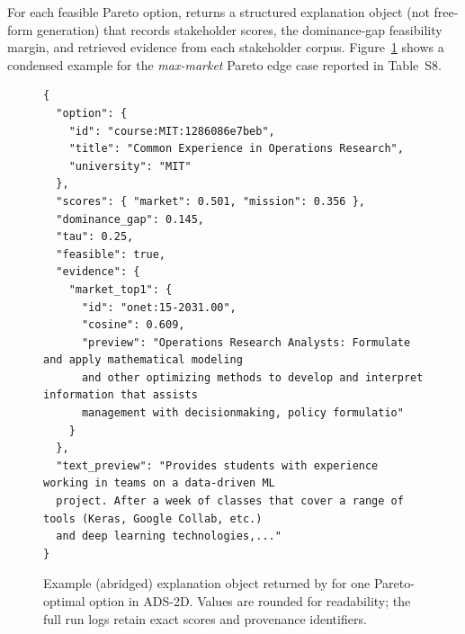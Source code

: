 





For each feasible Pareto option, \MAPE returns a structured explanation object (not free-form generation) that records stakeholder scores, the dominance-gap feasibility margin, and retrieved evidence from each stakeholder corpus. Figure~\ref{fig:supp-explobj} shows a condensed example for the \textit{max-market} Pareto edge case reported in Table~S8.

\begin{figure}[h]
  \centering
  \small
  \begin{minipage}{0.96\linewidth}
\begin{verbatim}
{
  "option": {
    "id": "course:MIT:1286086e7beb",
    "title": "Common Experience in Operations Research",
    "university": "MIT"
  },
  "scores": { "market": 0.501, "mission": 0.356 },
  "dominance_gap": 0.145,
  "tau": 0.25,
  "feasible": true,
  "evidence": {
    "market_top1": {
      "id": "onet:15-2031.00",
      "cosine": 0.609,
      "preview": "Operations Research Analysts: Formulate and apply mathematical modeling 
      and other optimizing methods to develop and interpret information that assists 
      management with decisionmaking, policy formulatio"
    }
  },
  "text_preview": "Provides students with experience working in teams on a data-driven ML 
  project. After a week of classes that cover a range of tools (Keras, Google Collab, etc.) 
  and deep learning technologies,..."
}
\end{verbatim}
  \end{minipage}
  \caption{Example (abridged) explanation object returned by \MAPE for one Pareto-optimal option in ADS-2D. Values are rounded for readability; the full run logs retain exact scores and provenance identifiers.}
  \label{fig:supp-explobj}
\end{figure}

